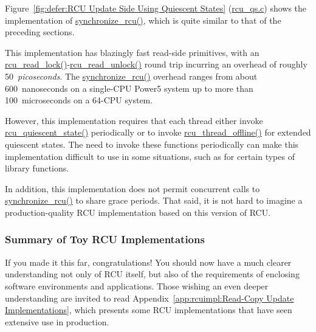 Figure~\ref{fig:defer:RCU Update Side Using Quiescent States}
(\url{rcu_qs.c})
shows the implementation of \url{synchronize_rcu()}, which is
quite similar to that of the preceding sections.

This implementation has blazingly fast read-side primitives, with
an \url{rcu_read_lock()}-\url{rcu_read_unlock()} round trip incurring
an overhead of roughly 50~\emph{picoseconds}.
The \url{synchronize_rcu()} overhead ranges from about 600~nanoseconds
on a single-CPU Power5 system up to more than 100~microseconds on
a 64-CPU system.

 \QuickQuizEnd

However, this implementation requires that each thread either
invoke \url{rcu_quiescent_state()} periodically or to invoke
\url{rcu_thread_offline()} for extended quiescent states.
The need to invoke these functions periodically can make this
implementation difficult to use in some situations, such as for
certain types of library functions.

 \QuickQuizEnd

In addition, this implementation does not permit concurrent calls
to \url{synchronize_rcu()} to share grace periods.
That said, it is not hard to imagine a production-quality RCU
implementation based on this version of RCU.

\subsubsection{Summary of Toy RCU Implementations}
\label{defer:Summary of Toy RCU Implementations}

If you made it this far, congratulations!
You should now have a much clearer understanding
not only of RCU itself, but also of the requirements of enclosing
software environments and applications.
Those wishing an even deeper understanding are invited to read
Appendix~\ref{app:rcuimpl:Read-Copy Update Implementations},
which presents some RCU implementations that have seen extensive
use in production.
